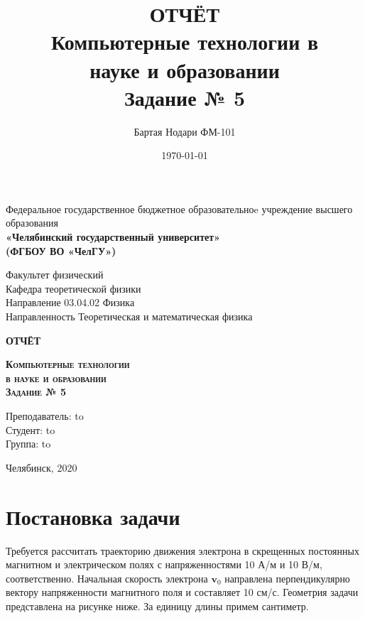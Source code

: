 \documentclass[a4paper]{article}
\author{Бартая Нодари ФМ-101}
\title{ОТЧЁТ\\ Компьютерные технологии в\\ науке и образовании\\ Задание № 5}
\date{\today}
\begin{document}
\begin{titlepage}
	\begin{center}
	Федеральное государственное бюджетное образовательноe учреждение высшего образования \\
	\textbf{«Челябинский государственный университет» \\ (ФГБОУ ВО «ЧелГУ»)}
	\end{center}
	\begin{center}
		Факультет физический			\\
		Кафедра теоретической физики	\\
		Направление 03.04.02 Физика		\\
		Направленность Теоретическая и математическая физика
	\end{center}
	\vfill
	\begin{center}
		\textbf{ОТЧЁТ}
	\end{center}
	\begin{center}
		\textsc{\textbf{Компьютерные технологии\\ в науке и образовании\\ Задание № 5}}
	\end{center}
	\vfill
	\newbox{\lbox}
	\newlength{\maxl}
	\setlength{\maxl}{\wd\lbox}
	\hfill\parbox{15cm}{
		\begin{flushright}
		\hfill Преподаватель:   \hbox to\\
		\hfill Студент:   \hbox to\\
		\hfill Группа:   \hbox to\\
		\end{flushright}
	}
	\vfill
	\begin{center}
		Челябинск, 2020	
	\end{center}
\end{titlepage}

\tableofcontents
\setcounter{page}{2}
\newpage
\section{Постановка задачи}\label{Problem}
Требуется рассчитать траекторию движения электрона в скрещенных
постоянных магнитном и электрическом полях с напряженностями 10 А/м и 10 В/м, соответственно. 
Начальная скорость электрона $\mathbf{v}_0$ направлена перпендикулярно вектору напряженности магнитного поля и составляет 10 см/с.
Геометрия задачи представлена на рисунке ниже. За единицу длины примем сантиметр.
\end{document}
